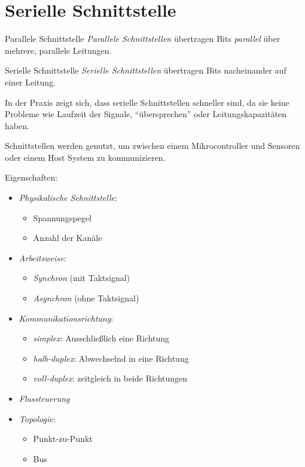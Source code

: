 \section{Serielle Schnittstelle}

\begin{defi}{Parallele Schnittstelle}
    \emph{Parallele Schnittstellen} übertragen Bits \emph{parallel} über mehrere, parallele Leitungen.
\end{defi}

\begin{defi}{Serielle Schnittstelle}
    \emph{Serielle Schnittstellen} übertragen Bits nacheinander auf einer Leitung.

    In der Praxis zeigt sich, dass serielle Schnittstellen schneller sind, da sie keine Probleme wie Laufzeit der Signale, \enquote{übersprechen} oder Leitungskapazitäten haben.
\end{defi}

\begin{defi}
    Schnittstellen werden genutzt, um zwischen einem Mikrocontroller und Sensoren oder einem Host System zu kommunizieren.

    Eigenschaften:
    \begin{itemize}
        \item \emph{Physikalische Schnittstelle}:
              \begin{itemize}
                  \item Spannungspegel
                  \item Anzahl der Kanäle
              \end{itemize}
        \item \emph{Arbeitsweise}:
              \begin{itemize}
                  \item \emph{Synchron} (mit Taktsignal)
                  \item \emph{Asynchron} (ohne Taktsignal)
              \end{itemize}
        \item \emph{Kommunikationsrichtung}:
              \begin{itemize}
                  \item \emph{simplex}: Ausschließlich eine Richtung
                  \item \emph{halb-duplex}: Abwechselnd in eine Richtung
                  \item \emph{voll-duplex}: zeitgleich in beide Richtungen
              \end{itemize}
        \item \emph{Flussteuerung}
        \item \emph{Topologie}:
              \begin{itemize}
                  \item Punkt-zu-Punkt
                  \item Bus
              \end{itemize}
    \end{itemize}
\end{defi}

